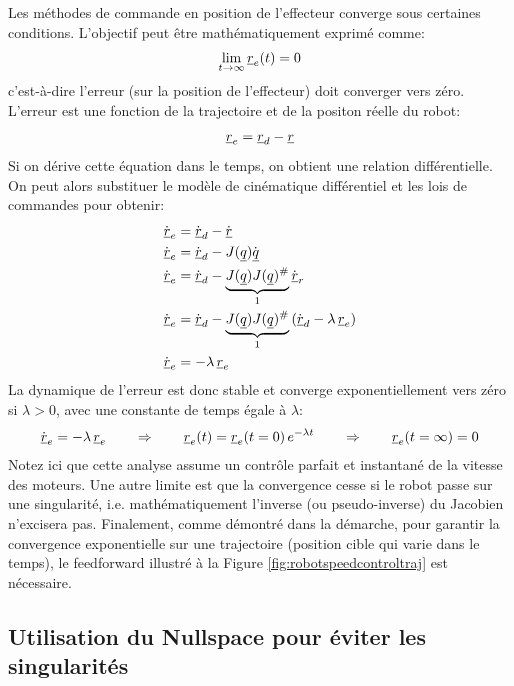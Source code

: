 Les méthodes de commande en position de l'effecteur converge sous certaines conditions. L'objectif peut être mathématiquement exprimé comme:
\begin{align}
\lim_{t \rightarrow \infty } \underline{r}_e(t) = 0 
\end{align}
c'est-à-dire l'erreur (sur la position de l'effecteur) doit converger vers zéro. L'erreur est une fonction de la trajectoire et de la positon réelle du robot:
\begin{align}
\underline{r}_e = \underline{r}_d - \underline{r}
\end{align}
Si on dérive cette équation dans le temps, on obtient une relation différentielle. On peut alors substituer le modèle de cinématique différentiel et les lois de commandes pour obtenir:
\begin{align}
\dot{\underline{r}}_e  &= \dot{\underline{r}}_d - \dot{\underline{r}} \\
\dot{\underline{r}}_e  &= \dot{\underline{r}}_d - J(\underline{q}) \dot{\underline{q}} \\
\dot{\underline{r}}_e  &= \dot{\underline{r}}_d - \underbrace{J(\underline{q}) J(\underline{q})^{\#} }_{1} \dot{\underline{r}}_r \\
\dot{\underline{r}}_e  &= \dot{\underline{r}}_d - \underbrace{J(\underline{q}) J(\underline{q})^{\#} }_{1}  \left( \dot{\underline{r}}_d - \lambda \, \underline{r}_e \right) \\
\dot{\underline{r}}_e  &= - \lambda \, \underline{r}_e  
\end{align}
La dynamique de l'erreur est donc stable et converge exponentiellement vers zéro si $\lambda>0$, avec une constante de temps égale à $\lambda$:
\begin{align}
\dot{\underline{r}}_e = - \lambda \, \underline{r}_e 
\quad\quad \Rightarrow \quad\quad 
\underline{r}_e(t) = \underline{r}_e(t=0) \, e^{- \lambda t} 
\quad\quad \Rightarrow \quad\quad 
\underline{r}_e(t=\infty) = 0
\end{align}
Notez ici que cette analyse assume un contrôle parfait et instantané de la vitesse des moteurs. Une autre limite est que la convergence cesse si le robot passe sur une singularité, i.e. mathématiquement l'inverse (ou pseudo-inverse) du Jacobien n'excisera pas. Finalement, comme démontré dans la démarche, pour garantir la convergence exponentielle sur une trajectoire (position cible qui varie dans le temps), le feedforward illustré à la Figure \ref{fig:robotspeedcontroltraj} est nécessaire.


\subsection{Utilisation du Nullspace pour éviter les singularités}

